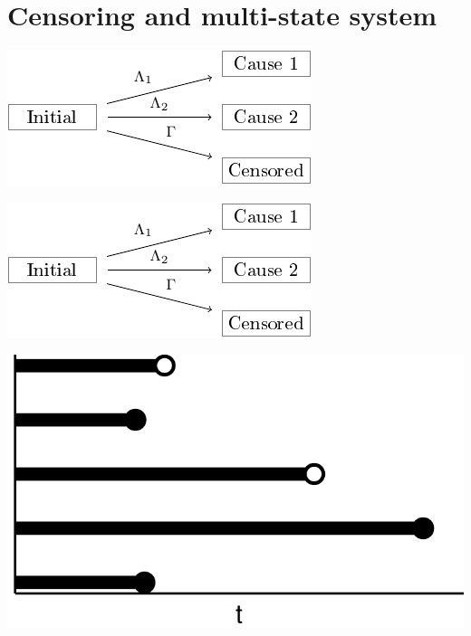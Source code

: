 \documentclass[11pt]{article}
\begin{document}
\section{Censoring and multi-state system}
\label{sec:org331a06f}

\begin{center}
\includegraphics[width=.9\linewidth]{comp-risk-observed-w-text.pdf}
\end{center}

\begin{center}
\includegraphics[width=.9\linewidth]{comp-risk-observed-w-text.pdf}
\end{center}


\begin{center}
\includegraphics[width=.9\linewidth]{./multi-state-data-1.pdf}
\end{center}
\end{document}
